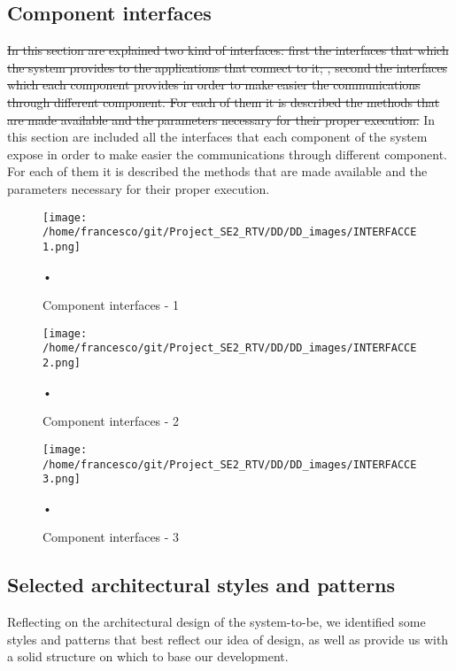 \documentclass[10pt, a4paper,titlepage]{article}
\begin{document}
\subsection{Component interfaces}
\sout{In this section are explained two kind of interfaces: first the interfaces that which the system provides to the applications that connect to it; , second the interfaces which each component provides in order to make easier the communications through different component. For each of them it is described the methods that are made available and the parameters necessary for their proper execution.} In this section are included all the interfaces that each component of the system expose in order to make easier the communications through different component. For each of them it is described the methods that are made available and the parameters necessary for their proper execution. 
\begin{figure}[h]
\begin{center}
\texttt{[image: /home/francesco/git/Project\_SE2\_RTV/DD/DD\_images/INTERFACCE1.png]}
\caption{Component interfaces - 1}
\label{fig:scomponent_interfaces}
\end{center}•
\end{figure}
\begin{figure}[h]
\begin{center}
\texttt{[image: /home/francesco/git/Project\_SE2\_RTV/DD/DD\_images/INTERFACCE2.png]}
\caption{Component interfaces - 2}
\label{fig:scomponent_interfaces}
\end{center}•
\end{figure}
\begin{figure}[h]
\begin{center}
\texttt{[image: /home/francesco/git/Project\_SE2\_RTV/DD/DD\_images/INTERFACCE3.png]}
\caption{Component interfaces - 3}
\label{fig:scomponent_interfaces}
\end{center}•
\end{figure}
\clearpage
\subsection{Selected architectural styles and patterns}
Reflecting on the architectural design of the system-to-be, we identified some styles and patterns that best reflect our idea of design, as well as provide us with a solid structure on which to base our development.
\end{document}
